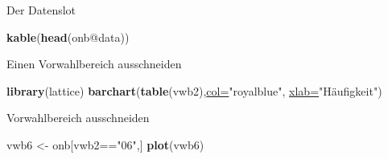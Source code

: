\documentclass[ignorenonframetext,]{beamer}
\newenvironment{Shaded}{\begin{snugshade}}{\end{snugshade}}
\newcommand{\DataTypeTok}[1]{\textcolor[rgb]{0.74,0.68,0.62}{\underline{#1}}}
\newcommand{\DecValTok}[1]{\textcolor[rgb]{0.27,0.67,0.26}{#1}}
\newcommand{\KeywordTok}[1]{\textcolor[rgb]{0.26,0.66,0.93}{\textbf{#1}}}
\newcommand{\NormalTok}[1]{\textcolor[rgb]{0.74,0.68,0.62}{#1}}
\newcommand{\OperatorTok}[1]{\textcolor[rgb]{0.74,0.68,0.62}{#1}}
\newcommand{\StringTok}[1]{\textcolor[rgb]{0.02,0.61,0.04}{#1}}
\begin{document}
\begin{frame}[fragile]{Der Datenslot}
\protect\hypertarget{der-datenslot}{}

\begin{Shaded}
\begin{Highlighting}[]
\KeywordTok{kable}\NormalTok{(}\KeywordTok{head}\NormalTok{(onb}\OperatorTok{@}\NormalTok{data))}
\end{Highlighting}
\end{Shaded}

\end{frame}

\begin{frame}[fragile]{Einen Vorwahlbereich ausschneiden}
\protect\hypertarget{einen-vorwahlbereich-ausschneiden}{}

\begin{Shaded}
\end{Shaded}

\begin{Shaded}
\begin{Highlighting}[]
\KeywordTok{library}\NormalTok{(lattice)}
\KeywordTok{barchart}\NormalTok{(}\KeywordTok{table}\NormalTok{(vwb2),}\DataTypeTok{col=}\StringTok{"royalblue"}\NormalTok{,}
         \DataTypeTok{xlab=}\StringTok{"Häufigkeit"}\NormalTok{)}
\end{Highlighting}
\end{Shaded}

\end{frame}

\begin{frame}[fragile]{Vorwahlbereich ausschneiden}
\protect\hypertarget{vorwahlbereich-ausschneiden}{}

\begin{Shaded}
\begin{Highlighting}[]
\NormalTok{vwb6 <-}\StringTok{ }\NormalTok{onb[vwb2}\OperatorTok{==}\StringTok{"06"}\NormalTok{,]}
\KeywordTok{plot}\NormalTok{(vwb6)}
\end{Highlighting}
\end{Shaded}

\end{frame}
\end{document}

